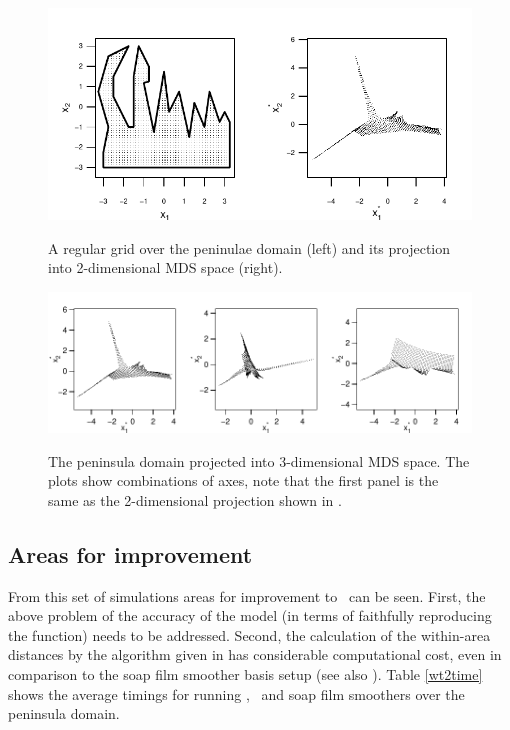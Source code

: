 \begin{figure}
\centering
\includegraphics[width=6in]{mds/figs/wt2-2d-proj.pdf} \\
\caption{A regular grid over the peninulae domain (left) and its projection into 2-dimensional MDS space (right).}
\label{wt2-2d-proj}
\end{figure}

\begin{figure}
\includegraphics[width=9in]{mds/figs/wt2-3d-proj.pdf} \\
\caption{The peninsula domain projected into 3-dimensional MDS space. The plots show combinations of axes, note that the first panel is the same as the 2-dimensional projection shown in .}
\label{wt2-3d-proj}
\end{figure}

\subsection{Areas for improvement}

From this set of simulations areas for improvement to \mdsap\ can be seen. First, the above problem of the accuracy of the model (in terms of faithfully reproducing the function) needs to be addressed. Second, the calculation of the within-area distances by the algorithm given in  has considerable computational cost, even in comparison to the soap film smoother basis setup (see also ). Table \ref{wt2time} shows the average timings for running \mdsap, \tprs\ and soap film smoothers over the peninsula domain.


